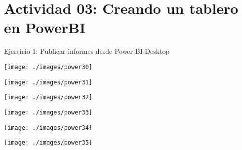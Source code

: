 \section{Actividad 03: Creando un tablero en PowerBI} 

Ejercicio 1: Publicar informes desde Power BI Desktop \\

	\begin{center}
	\texttt{[image: ./images/power30]}
	\end{center}	

	\begin{center}
	\texttt{[image: ./images/power31]}
	\end{center}	

	\begin{center}
	\texttt{[image: ./images/power32]}
	\end{center}	

	\begin{center}
	\texttt{[image: ./images/power33]}
	\end{center}	

	\begin{center}
	\texttt{[image: ./images/power34]}
	\end{center}	

	\begin{center}
	\texttt{[image: ./images/power35]}
	\end{center}	
